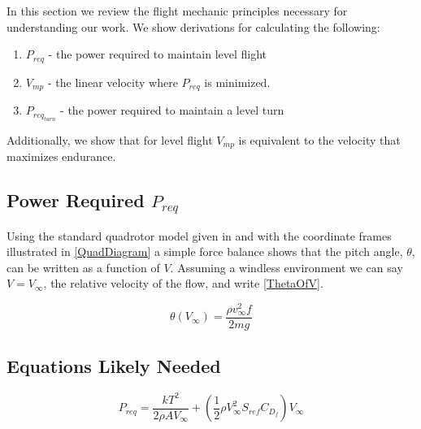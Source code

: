 In this section we review the flight mechanic principles necessary for understanding our work. We show derivations for calculating the following: \begin{enumerate}
    \item $P_{req}$ - the power required to maintain level flight 
    \item $V_{mp}$ - the linear velocity where $P_{req}$ is minimized.
    \item $P_{req_{turn}}$ - the power required to maintain a level turn
\end{enumerate} Additionally, we show that for level flight $V_{mp}$ is equivalent to the velocity that maximizes endurance.

\subsection{Power Required $P_{req}$}
Using the standard quadrotor model given in \cite{hoffmann2004stanford} and \cite{pounds2002design} with the coordinate frames illustrated in \ref{QuadDiagram} a simple force balance shows that the pitch angle, $\theta$, can be written as a function of $V$. Assuming a windless environment we can say $V = V_\infty$, the relative velocity of the flow, and write \eqref{ThetaOfV}.

\begin{equation}
    \label{ThetaOfV}
    \theta(V_\infty) = \frac{\rho v_\infty^2 f}{2mg}
\end{equation}

\subsection{Equations Likely Needed}

\begin{equation}
    \label{LevelFlightEqn}
    P_{req} = \frac{k T^2}{2\rho A V_\infty}+(\frac{1}{2}\rho V_\infty^2 S_{ref} C_{D_f})V_\infty
\end{equation}


